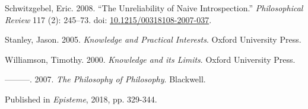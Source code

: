 \documentclass[
  11pt,
  letterpaper,
  DIV=11,
  numbers=noendperiod,
  twoside]{scrartcl}
\newlength{\cslhangindent}
\newenvironment{CSLReferences}[2] %
 {\begin{list}{}{%
  \setlength{\itemindent}{0pt}
  \setlength{\leftmargin}{0pt}
  \setlength{\parsep}{0pt}
  \ifodd #1
   \setlength{\leftmargin}{\cslhangindent}
   \setlength{\itemindent}{-1\cslhangindent}
  \fi
  \setlength{\itemsep}{#2\baselineskip}}}
 {\end{list}}
\begin{document}
\begin{CSLReferences}{1}{0}
Schwitzgebel, Eric. 2008. {``The Unreliability of Naive
Introspection.''} \emph{Philosophical Review} 117 (2): 245--73. doi:
\href{https://doi.org/10.1215/00318108-2007-037}{10.1215/00318108-2007-037}.

Stanley, Jason. 2005. \emph{{Knowledge and Practical Interests}}. Oxford
University Press.

Williamson, Timothy. 2000. \emph{{Knowledge and its Limits}}. Oxford
University Press.

---------. 2007. \emph{{The Philosophy of Philosophy}}. Blackwell.

\end{CSLReferences}



\noindent Published in\emph{
Episteme}, 2018, pp. 329-344.
\end{document}
